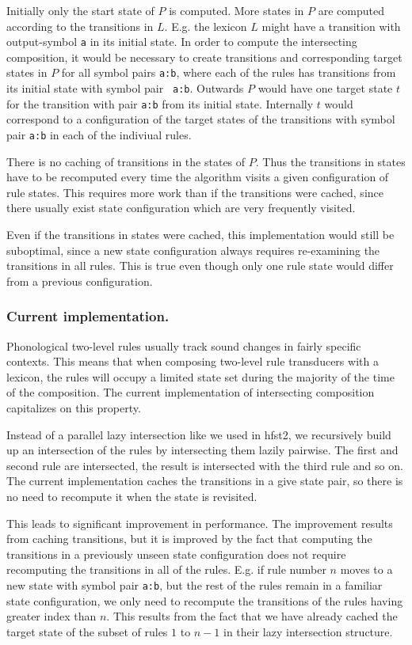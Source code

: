 \documentclass{llncs}
\begin{document}
Initially only the start state of $P$ is computed. More states in $P$
are computed according to the transitions in $L$. E.g. the lexicon $L$
might have a transition with output-symbol {\tt a} in its initial
state. In order to compute the intersecting composition, it would be
necessary to create transitions and corresponding target states in $P$
for all symbol pairs {\tt a:b}, where each of the rules has
transitions from its initial state with symbol pair {\tt
  a:b}. Outwards $P$ would have one target state $t$ for the
transition with pair {\tt a:b} from its initial state. Internally $t$
would correspond to a configuration of the target states of the
transitions with symbol pair {\tt a:b} in each of the indiviual rules.

There is no caching of transitions in the states of $P$. Thus the
transitions in states have to be recomputed every time the algorithm
visits a given configuration of rule states. This requires more work
than if the transitions were cached, since there usually exist state
configuration which are very frequently visited.

Even if the transitions in states were cached, this implementation
would still be suboptimal, since a new state configuration always
requires re-examining the transitions in all rules. This is true even
though only one rule state would differ from a previous configuration.

\subsubsection{Current implementation.}

Phonological two-level rules usually track sound changes in fairly
specific contexts. This means that when composing two-level rule
transducers with a lexicon, the rules will occupy a limited state set
during the majority of the time of the composition. The current
implementation of intersecting composition capitalizes on this
property.

Instead of a parallel lazy intersection like we used in hfst2, we
recursively build up an intersection of the rules by intersecting them
lazily pairwise. The first and second rule are intersected, the result
is intersected with the third rule and so on. The current
implementation caches the transitions in a give state pair, so there
is no need to recompute it when the state is revisited.

This leads to significant improvement in performance. The improvement
results from caching transitions, but it is improved by the fact that
computing the transitions in a previously unseen state configuration
does not require recomputing the transitions in all of the
rules. E.g. if rule number $n$ moves to a new state with symbol pair
{\tt a:b}, but the rest of the rules remain in a familiar state
configuration, we only need to recompute the transitions of the rules
having greater index than $n$. This results from the fact that we have
already cached the target state of the subset of rules $1$ to $n-1$ in
their lazy intersection structure.
\end{document}
